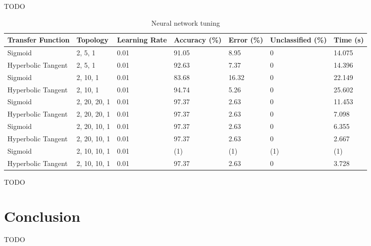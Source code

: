 \documentclass[a4paper]{article}
\begin{document}
TODO

\begin{table}[h!]
  \centering
  \begin{tabular}{@{}lllllll@{}}
    \toprule
    Transfer Function  & Topology     & Learning Rate & Accuracy (\%) & Error (\%) & Unclassified (\%) & Time (s) \\
    \midrule
    Sigmoid            & 2, 5, 1      & 0.01          & 91.05         & 8.95       & 0                 & 14.075   \\
    Hyperbolic Tangent & 2, 5, 1      & 0.01          & 92.63         & 7.37       & 0                 & 14.396   \\
    Sigmoid            & 2, 10, 1     & 0.01          & 83.68         & 16.32      & 0                 & 22.149   \\
    Hyperbolic Tangent & 2, 10, 1     & 0.01          & 94.74         & 5.26       & 0                 & 25.602   \\
    Sigmoid            & 2, 20, 20, 1 & 0.01          & 97.37         & 2.63       & 0                 & 11.453   \\
    Hyperbolic Tangent & 2, 20, 20, 1 & 0.01          & 97.37         & 2.63       & 0                 & 7.098    \\
    Sigmoid            & 2, 20, 10, 1 & 0.01          & 97.37         & 2.63       & 0                 & 6.355    \\
    Hyperbolic Tangent & 2, 20, 10, 1 & 0.01          & 97.37         & 2.63       & 0                 & 2.667    \\
    Sigmoid            & 2, 10, 10, 1 & 0.01          & (1)           & (1)        & (1)               & (1)      \\
    Hyperbolic Tangent & 2, 10, 10, 1 & 0.01          & 97.37         & 2.63       & 0                 & 3.728    \\
    \bottomrule
  \end{tabular}
  \caption{Neural network tuning}
  \label{tab:nn_tuning}
\end{table}

TODO

\section{Conclusion}

TODO

\end{document}
